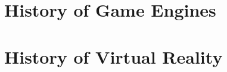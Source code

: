 \newpage
\section{History of Game Engines}
\label{sec:history_game_engines}

\newpage
\section{History of Virtual Reality}
\label{sec:history_vr}